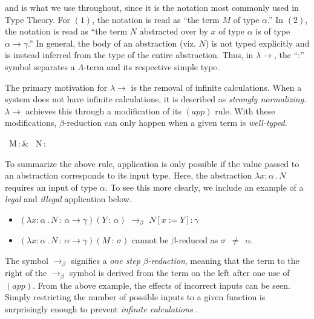 \documentclass[9pt,preprint,nocopyrightspace,computermodern]{sigplanconf} %
\begin{document}
and is what we use throughout, since it is the notation most commonly used in Type Theory.
For \((1)\), the notation is read as ``the term \(M\) of type \(\alpha\).''
In \((2)\), the notation is read as ``the term \(N\) abstracted over by \(x\)
of type \(\alpha\) is of type \(\alpha\rightarrow\gamma\).'' In general, the body of
an abstraction (viz. \(N\)) is not typed explicitly and is instead inferred from the
type of the entire abstraction. %
Thus, in \(\lambda\!\!\rightarrow\), the ``:'' symbol separates a
\(\Lambda\)-term and its respective simple type.

The primary motivation for \(\lambda\!\!\rightarrow\) is the removal of infinite
calculations. When a system does not have infinite calculations, it is described
as \textit{strongly normalizing}. \(\lambda\!\!\rightarrow\) achieves this through a
modification of its \((app)\) rule. With these modifications, \(\beta\)-reduction
can only happen when a given term is \textit{well-typed}.
\begin{center}
        {\Gamma\vdash\, M\,:\,\alpha\rightarrow\beta & \Gamma\vdash\, N\,:\,\alpha}
\end{center}
To summarize the above rule, application is only possible if the value passed to
an abstraction corresponds to its input type. Here, the abstraction
\(\lambda x : \alpha\,.\,N\) requires an input of type \(\alpha\). To see this
more clearly, we include an example of a \textit{legal} and \textit{illegal}
application below.
\begin{itemize}
\item \((\lambda x : \alpha\,.\,N\,:\,\alpha\rightarrow\gamma)(Y\,:\,\alpha)\)
  \(\rightarrow_\beta\) \(N[x := Y] : \gamma\)
\item \((\lambda x : \alpha\,.\,N\,:\,\alpha\rightarrow\gamma)(M\,:\,\sigma)\)
  cannot be \(\beta\)-reduced as \mbox{\(\sigma\) \(\not =\) \(\alpha\).}
\end{itemize}
The symbol \(\rightarrow_\beta\) signifies a \textit{one step \(\beta\)-reduction},
meaning that the term to the right of the \(\rightarrow_\beta\) symbol is derived
from the term on the left after one use of \((app)\). From the above example, the
effects of incorrect inputs can be seen. Simply restricting the number of possible
inputs to a given function is surprisingly enough to prevent
\textit{infinite calculations} \cite{san}.
\end{document}

